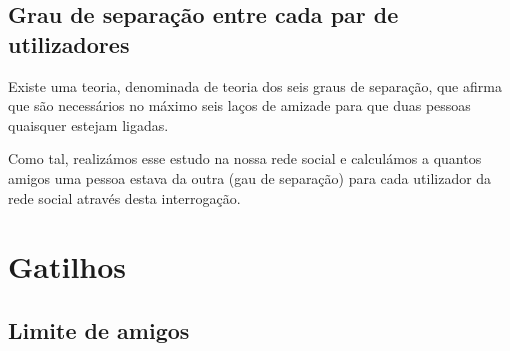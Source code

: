 \documentclass[12pt]{report}
\begin{document}
\section{Grau de separação entre cada par de utilizadores}
    
Existe uma teoria, denominada de teoria dos seis graus de separação, que afirma que são necessários no máximo seis laços de amizade para que duas pessoas quaisquer estejam ligadas. \par

Como tal, realizámos esse estudo na nossa rede social e calculámos a quantos amigos uma pessoa estava da outra (gau de separação) para cada utilizador da rede social através desta interrogação.


\begin{figure}[H]
    \centering
\end{figure}

\chapter{Gatilhos}

\section{Limite de amigos}
\end{document}
